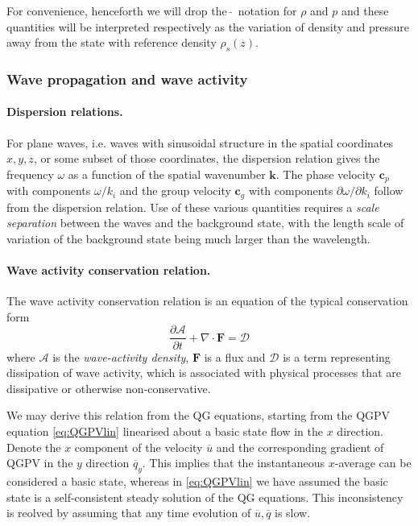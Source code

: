 \documentclass{jknotes}
\begin{document}
For convenience, henceforth we will drop the \,$\tilde{}$\, notation for $\rho$
and $p$ and these quantities will be interpreted respectively as the variation
of density and pressure away from the state with reference density
$\rho_s(z)$.

\subsubsection{Wave propagation and wave activity}
\paragraph{Dispersion relations.}
For plane waves, i.e. waves with sinusoidal structure in the spatial
coordinates $x, y, z$, or some subset of those coordinates, the dispersion
relation gives the frequency $\omega$ as a function of the spatial wavenumber
$\symbf{k}$. The phase velocity $\symbf{c}_p$ with components $\omega/k_i$ and
the group velocity $\symbf{c}_g$ with components $\partial \omega/\partial
k_i$ follow from the dispersion relation. Use of these various quantities
requires a \emph{scale separation} between the waves and the background
state, with the length scale of variation of the background state being much
larger than the wavelength.

\paragraph{Wave activity conservation relation.}
The wave activity conservation relation is an equation of the typical
conservation form
\begin{equation}
	\frac{\partial \mathcal{A}}{\partial t} + \nabla \cdot \symbf{F} =
	\mathcal{D}
\end{equation}
where $\mathcal{A}$ is the \emph{wave-activity density}, $\symbf{F}$ is a flux
and $\mathcal{D}$ is a term representing dissipation of wave activity, which
is associated with physical processes that are dissipative or otherwise
non-conservative.

We may derive this relation from the QG equations, starting from the QGPV
equation \eqref{eq:QGPVlin} linearised about a basic state flow in the $x$
direction. Denote the $x$ component of the velocity $\overline{u}$ and the
corresponding gradient of QGPV in the $y$ direction $\overline{q}_y$. This
implies that the instantaneous $x$-average can be considered a basic state,
whereas in \eqref{eq:QGPVlin} we have assumed the basic state is a
self-consistent steady solution of the QG equations. This inconsistency is
reolved by assuming that any time evolution of $\overline{u}, \overline{q}$ is
slow.
\end{document}
